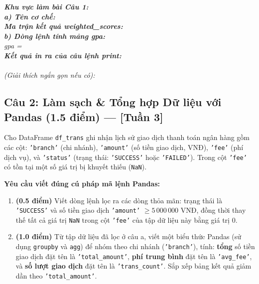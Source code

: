 \documentclass[11pt,a4paper]{article}
\newcommand{\answerbox}[2]{
  \vspace{1mm}
  \begin{tcolorbox}[
    colback=white,
    colframe=gray!60,
    boxrule=0.6pt,
    arc=2pt,
    height=#1,
    left=3mm, right=3mm, top=2mm, bottom=2mm
  ]
  \small\textit{\color{gray}#2}
  \end{tcolorbox}
  \vspace{1mm}
}
\begin{document}
\answerbox{12.0cm}{
\textbf{Khu vực làm bài Câu 1:}\\[3mm]
\textbf{a) Tên cơ chế:} \dotfill\\[4mm]
\textbf{Ma trận kết quả weighted\_scores:}\\[28mm]
\textbf{b) Dòng lệnh tính mảng gpa:}\\
gpa = \dotfill\\[5mm]
\textbf{Kết quả in ra của câu lệnh print:}\\
\dotfill\\[3mm]
\textit{(Giải thích ngắn gọn nếu có):} \dotfill
}

\newpage
\subsection*{Câu 2: Làm sạch \& Tổng hợp Dữ liệu với Pandas (1.5 điểm) --- [Tuần 3]}
Cho DataFrame \texttt{df\_trans} ghi nhận lịch sử giao dịch thanh toán ngân hàng gồm các cột:
\texttt{'branch'} (chi nhánh), \texttt{'amount'} (số tiền giao dịch, VNĐ), \texttt{'fee'} (phí dịch vụ), và \texttt{'status'} (trạng thái: \texttt{'SUCCESS'} hoặc \texttt{'FAILED'}). Trong cột \texttt{'fee'} có tồn tại một số giá trị bị khuyết thiếu (\texttt{NaN}).

\noindent
\textbf{Yêu cầu viết đúng cú pháp mã lệnh Pandas:}
\begin{enumerate}[label=\textbf{\alph*)}]
  \item \textbf{(0.5 điểm)} Viết dòng lệnh lọc ra các dòng thỏa mãn: trạng thái là \texttt{'SUCCESS'} và số tiền giao dịch \texttt{'amount'} $\ge 5\,000\,000$ VNĐ, đồng thời thay thế tất cả giá trị \texttt{NaN} trong cột \texttt{'fee'} của tập dữ liệu này bằng giá trị $0$.
  \item \textbf{(1.0 điểm)} Từ tập dữ liệu đã lọc ở câu a, viết một biểu thức Pandas (sử dụng \texttt{groupby} và \texttt{agg}) để nhóm theo chi nhánh (\texttt{'branch'}), tính: \textbf{tổng} số tiền giao dịch đặt tên là \texttt{'total\_amount'}, \textbf{phí trung bình} đặt tên là \texttt{'avg\_fee'}, và \textbf{số lượt giao dịch} đặt tên là \texttt{'trans\_count'}. Sắp xếp bảng kết quả giảm dần theo \texttt{'total\_amount'}.
\end{enumerate}
\end{document}
